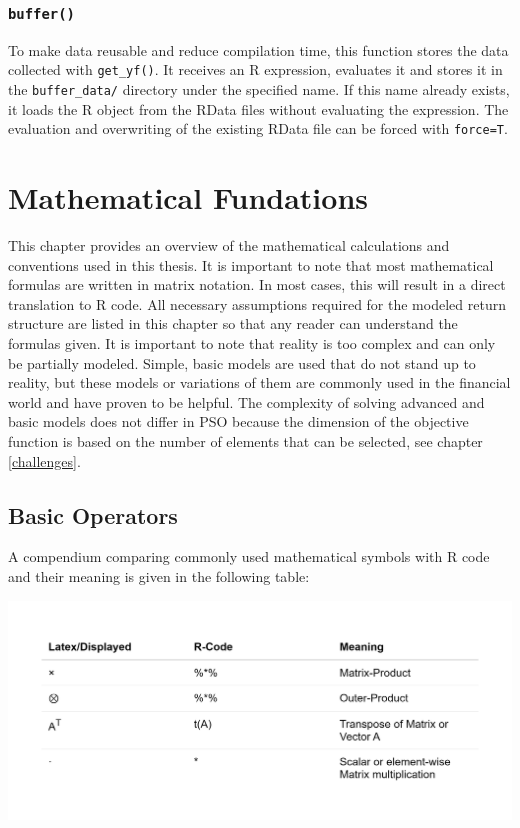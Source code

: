 \documentclass[
  oneside]{book}
\begin{document}
\hypertarget{buffer}{%
\subsection{\texorpdfstring{\texttt{buffer()}}{buffer()}}\label{buffer}}

To make data reusable and reduce compilation time, this function stores the data collected with \texttt{get\_yf()}. It receives an R expression, evaluates it and stores it in the \texttt{buffer\_data/} directory under the specified name. If this name already exists, it loads the R object from the RData files without evaluating the expression. The evaluation and overwriting of the existing RData file can be forced with \texttt{force=T}.

\hypertarget{mathfundations}{%
\chapter{Mathematical Fundations}\label{mathfundations}}

This chapter provides an overview of the mathematical calculations and conventions used in this thesis. It is important to note that most mathematical formulas are written in matrix notation. In most cases, this will result in a direct translation to R code. All necessary assumptions required for the modeled return structure are listed in this chapter so that any reader can understand the formulas given. It is important to note that reality is too complex and can only be partially modeled. Simple, basic models are used that do not stand up to reality, but these models or variations of them are commonly used in the financial world and have proven to be helpful. The complexity of solving advanced and basic models does not differ in PSO because the dimension of the objective function is based on the number of elements that can be selected, see chapter \ref{challenges}.

\hypertarget{basic-operators}{%
\section{Basic Operators}\label{basic-operators}}

A compendium comparing commonly used mathematical symbols with R code and their meaning is given in the following table:

\includegraphics{Master_Thesis_files/figure-latex/operators-1.png}
\end{document}
